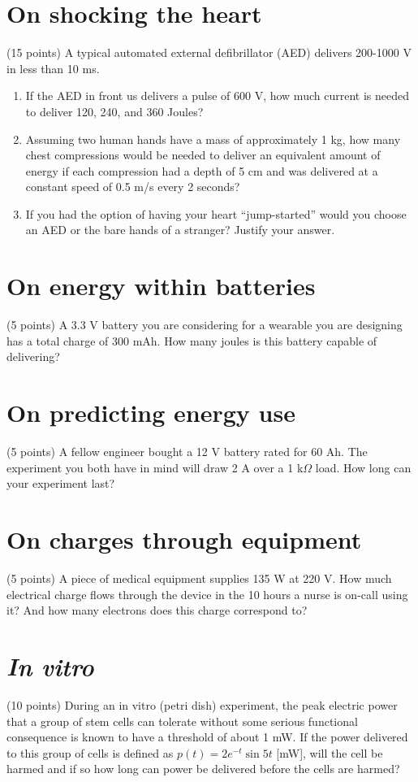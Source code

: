 \documentclass[11pt]{book}
\begin{document}
\section{On shocking the heart}
(15 points)	A typical automated external defibrillator (AED) delivers 200-1000 V in less than 10 ms. 
\begin{enumerate}
	\item If the AED in front us delivers a pulse of 600 V, how much current is needed to deliver 120, 240, and 360 Joules?
	\item Assuming two human hands have a mass of approximately 1 kg, how many chest compressions would be needed to deliver an equivalent amount of energy if each compression had a depth of 5 cm and was delivered at a constant speed of 0.5 m/s every 2 seconds?
	\item If you had the option of having your heart “jump-started” would you choose an AED or the bare hands of a stranger? Justify your answer.
\end{enumerate}

\newpage

\section{On energy within batteries}
(5 points) A  3.3 V battery you are considering for a wearable you are designing has a total charge of 300 mAh. How many joules is this battery capable of delivering?

\section{On predicting energy use}
(5 points) A fellow engineer bought a 12 V battery rated for 60 Ah. The experiment you both have in mind will draw 2 A over a 1 k$\Omega$ load. How long can your experiment last?

\section{On charges through equipment}
(5 points) A piece of medical equipment supplies 135 W at 220 V. How much electrical charge flows through the device in the 10 hours a nurse is on-call using it? And how many electrons does this charge correspond to?

\section{\textit{In vitro}}
(10 points) During an in vitro (petri dish) experiment, the peak electric power that a group of stem cells can tolerate without some serious functional consequence is known to have a threshold of about 1 mW. If the power delivered to this group of cells is defined as $p(t) = 2e^{-t}\sin 5t$ [mW], will the cell be harmed and if so how long can power be delivered before the cells are harmed?
\end{document}
